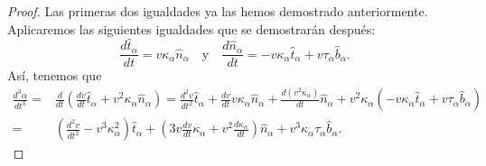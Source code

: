 \begin{proof}
Las primeras dos igualdades ya las hemos demostrado anteriormente. Aplicaremos las siguientes igualdades que se demostrarán después:
\[\frac{d\hat{t}_{\alpha }}{dt} = v\kappa_{\alpha }\hat{n}_{\alpha }\quad \text{y} \quad \frac{d\hat{n}_{\alpha }}{dt}=-v\kappa_{\alpha }\hat{t}_{\alpha } + v\tau_{\alpha }\hat{b}_{\alpha } .\]
Así, tenemos que 
\[
\begin{split}
	\frac{d^{3}\alpha }{dt ^{3}}= & \frac{d}{dt}\left(\frac{dv}{dt}\hat{t}_{\alpha }+v^{2}\kappa_{\alpha }\hat{n}_{\alpha }\right)=\frac{d^{2}v}{dt ^{2}}\hat{t}_{\alpha }+\frac{dv}{dt}v\kappa_{\alpha }\hat{n}_{\alpha } +\frac{d\left(v^{2}\kappa_{\alpha }\right)}{dt}\hat{n}_{\alpha } + v^{2}\kappa_{\alpha }\left(-v\kappa_{\alpha }\hat{t}_{\alpha }+v\tau_{\alpha }\hat{b}_{\alpha }\right)\\
	= & \left(\frac{d^{2}v}{dt ^{2}}-v^{3}\kappa_{\alpha }^{2}\right)\hat{t}_{\alpha } + \left(3v\frac{dv}{dt}\kappa_{\alpha }+v^{2}\frac{d\kappa_{\alpha }}{dt}\right)\hat{n}_{\alpha }+v^{3}\kappa_{\alpha }\tau_{\alpha }\hat{b}_{\alpha }.
\end{split}
\]
\end{proof}


